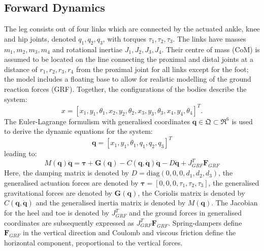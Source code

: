 \documentclass[letterpaper, 10 pt, conference]{ieeeconf}  %
\begin{document}
\subsection{Forward Dynamics} 
The leg consists out of four links which are connected by the actuated ankle, knee and hip joints, denoted $q_1,q_2,q_3$, with torques $\tau_1,\tau_2,\tau_3$. %
The links have masses $m_1,m_2,m_3,m_4$ and rotational inertiae $J_1,J_2,J_3,J_4$. Their centre of mass (CoM) is assumed to be located on the line connecting the proximal and distal joints at a distance of $r_1,r_2,r_3,r_4$ from the proximal joint for all links except for the foot; the model includes a floating base to allow for realistic modelling of the ground reaction forces (GRF). Together, the configurations of the bodies describe the system:
 \begin{equation}
x = [x_1,y_1,\theta_1,x_2,y_2,\theta_2, x_3,y_3,\theta_3,x_4,y_4,\theta_4]^T. 
\end{equation}
The Euler-Lagrange formulism with generalised coordinates $\mathbf{q} \in \mathfrak{Q} \subset \mathfrak{R}^{6}$ is used to derive the dynamic equations for the system:
 \begin{equation}
\mathbf{q}=[x_1,y_1,\theta_1,q_1,q_2,q_3]^T \label{eq:q}
 \end{equation}
leading to:
 \begin{equation}
M(\mathbf{q})\mathbf{\ddot q} = \mathbf{\boldsymbol{\tau} + G(q)} - C\mathbf{(q,\dot q)\dot q -} D \mathbf{\dot q} + J_{GRF}^T \mathbf{F}_{GRF}
\label{eq:fwddyn}
 \end{equation}
Here, the damping matrix is denoted by $D = \text{diag} (0,0,0,d_1,d_2,d_3)$, the generalised actuation forces are denoted by $\boldsymbol{\tau} = [0,0,0,\tau_1,\tau_2,\tau_3]$, the generalised gravitational forces are denoted by $\mathbf{G(q)}$, the Coriolis matrix is denoted by $C\mathbf{(q, \dot q)}$ and the generalised inertia matrix is denoted by $M(\mathbf{q})$. The Jacobian for the heel and toe is denoted by $J_{GRF}^T$ and the ground forces in generalised coordinates are subsequently expressed as $J_{GRF}^T \mathbf{F}_{GRF}$. Spring-dampers define $\mathbf{F}_{GRF}$ in the vertical direction and Coulomb and viscous friction define the horizontal component, proportional to the vertical forces.
 
 
\end{document}
